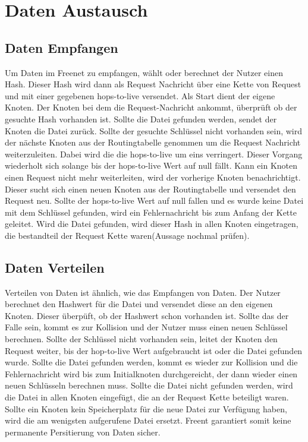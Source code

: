 \section{Daten Austausch}
\subsection{Daten Empfangen}
Um Daten im Freenet zu empfangen, wählt oder berechnet der Nutzer einen Hash.
Dieser Hash wird dann als Request Nachricht über eine Kette von Request und
mit einer gegebenen hops-to-live versendet. Als Start dient der eigene Knoten.
Der Knoten bei dem die Request-Nachricht ankommt, überprüft ob der gesuchte
Hash vorhanden ist. Sollte die Datei gefunden werden, sendet der Knoten
die Datei zurück. Sollte der gesuchte Schlüssel nicht vorhanden sein, wird
der nächste Knoten aus der Routingtabelle genommen um die Request Nachricht
weiterzuleiten. Dabei wird die die hops-to-live um eins verringert. Dieser
Vorgang wiederholt sich solange bis der hops-to-live Wert auf null fällt.
Kann ein Knoten einen Request nicht mehr weiterleiten, wird der vorherige
Knoten benachrichtigt. Dieser sucht sich einen neuen Knoten aus der
Routingtabelle und versendet den Request neu. Sollte der hops-to-live Wert auf
null fallen und es wurde keine Datei mit dem Schlüssel gefunden, wird ein
Fehlernachricht bis zum Anfang der Kette geleitet.
Wird die Datei gefunden, wird dieser Hash in allen Knoten eingetragen, die
bestandteil der Request Kette waren(Aussage nochmal prüfen).

\subsection{Daten Verteilen}
Verteilen von Daten ist ähnlich, wie das Empfangen von Daten. Der Nutzer
berechnet den Hashwert für die Datei und versendet diese an den eigenen Knoten.
Dieser überpüft, ob der Hashwert schon vorhanden ist. Sollte das der Falle sein,
kommt es zur Kollision und der Nutzer muss einen neuen Schlüssel berechnen.
Sollte der Schlüssel nicht vorhanden sein, leitet der Knoten den Request
weiter, bis der hop-to-live Wert aufgebraucht ist oder die Datei gefunden
wurde. Sollte die Datei gefunden werden, kommt es wieder zur Kollision und die
Fehlernachricht wird bis zum Initialknoten durchgereicht, der dann wieder einen
neuen Schlüsseln berechnen muss. Sollte die Datei nicht gefunden werden, wird
die Datei in allen Knoten eingefügt, die an der Request Kette beteiligt waren.
Sollte ein Knoten kein Speicherplatz für die neue Datei zur Verfügung haben,
wird die am wenigsten aufgerufene Datei ersetzt. Freent garantiert somit keine
permanente Persitierung von Daten sicher.
